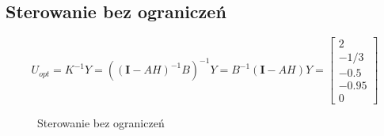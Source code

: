 \documentclass{article}
\begin{document}
\subsection{Sterowanie bez ograniczeń}
\begin{equation}
U_{opt} = K^{-1} Y = ((\mathbf{I} - A H)^{-1} B) ^ {-1} Y = B^{-1}(\mathbf{I} - A H) Y = \begin{bmatrix}
2 \\ -1/3 \\ -0.5 \\ -0.95 \\ 0
\end{bmatrix}
\end{equation}

\begin{figure}[ht]
\centering
{}
\caption{Sterowanie bez ograniczeń}
\end{figure}
\end{document}
